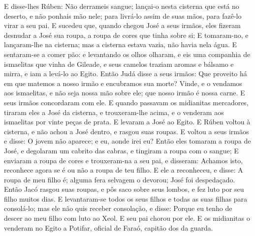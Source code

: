 {{E disse-lhes Rúben: Não derrameis sangue; lançai-o nesta cisterna que está no deserto, e não ponhais mão nele; para livrá-lo assim de suas mãos, para fazê-lo virar a seu pai.
E sucedeu que, quando chegou José a seus irmãos, eles fizeram desnudar a José sua roupa, a roupa de cores que tinha sobre si;
E tomaram-no, e lançaram-lhe na cisterna; mas a cisterna estava vazia, não havia nela água.
E sentaram-se a comer pão: e levantando os olhos olharam, e eis uma companhia de ismaelitas que vinha de Gileade, e seus camelos traziam aromas e bálsamo e mirra, e iam a levá-lo ao Egito.
Então Judá disse a seus irmãos: Que proveito há em que matemos a nosso irmão e encubramos sua morte?
Vinde, e o vendamos aos ismaelitas, e não seja nossa mão sobre ele; que nosso irmão é nossa carne. E seus irmãos concordaram com ele.
E quando passavam os midianitas mercadores, tiraram eles a José da cisterna, e trouxeram-lhe acima, e o venderam aos ismaelitas por vinte peças de prata. E levaram a José ao Egito.
E Rúben voltou à cisterna, e não achou a José dentro, e rasgou suas roupas.
E voltou a seus irmãos e disse: O jovem não aparece; e eu, aonde irei eu?
Então eles tomaram a roupa de José, e degolaram um cabrito das cabras, e tingiram a roupa com o sangue;
E enviaram a roupa de cores e trouxeram-na a seu pai, e disseram: Achamos isto, reconhece agora se é ou não a roupa de teu filho.
E ele a reconheceu, e disse: A roupa de meu filho é; alguma fera selvagem o devorou; José foi despedaçado.
Então Jacó rasgou suas roupas, e pôs saco sobre seus lombos, e fez luto por seu filho muitos dias.
E levantaram-se todos os seus filhos e todas as suas filhas para consolá-lo; mas ele não quis receber consolação, e disse: Porque eu tenho de descer ao meu filho com luto ao Xeol.
 E seu pai chorou por ele.
E os midianitas o venderam no Egito a Potifar, oficial de Faraó, capitão dos da guarda.

\par}

}
